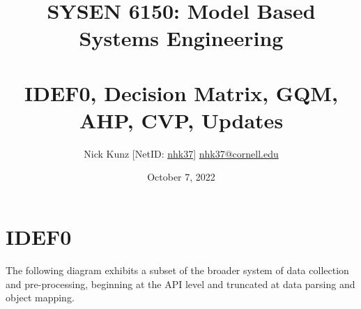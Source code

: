 \documentclass{article}
\begin{document}
\title{SYSEN 6150: Model Based Systems Engineering\\~\\
    \Large IDEF0, Decision Matrix, GQM, AHP, CVP, Updates
}
\author{
    Nick Kunz [NetID: \url{nhk37}] \hyperlink{nhk37@cornell.edu}{nhk37@cornell.edu}
}
\date{October 7, 2022}
\maketitle
\thispagestyle{fancy}

\section*{IDEF0}
The following diagram exhibits a subset of the broader system of data collection and pre-processing, beginning at the API level and truncated at data parsing and object mapping.

\\~\\
\\~\\
\end{document}
